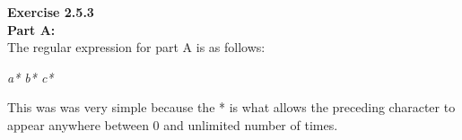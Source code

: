 \documentclass{article}
\theoremstyle{theorem}
\theoremstyle{definition}
\theoremstyle{remark}
\begin{document}



\textbf{Exercise 2.5.3}\\
\textbf{Part A:}\\
The regular expression for part A is as follows:
\begin{center}
   \textit{a* b* c*}
\end{center}
This was was very simple because the * is what allows the preceding character to appear anywhere between 0 and unlimited number of times.\\
\end{document}
